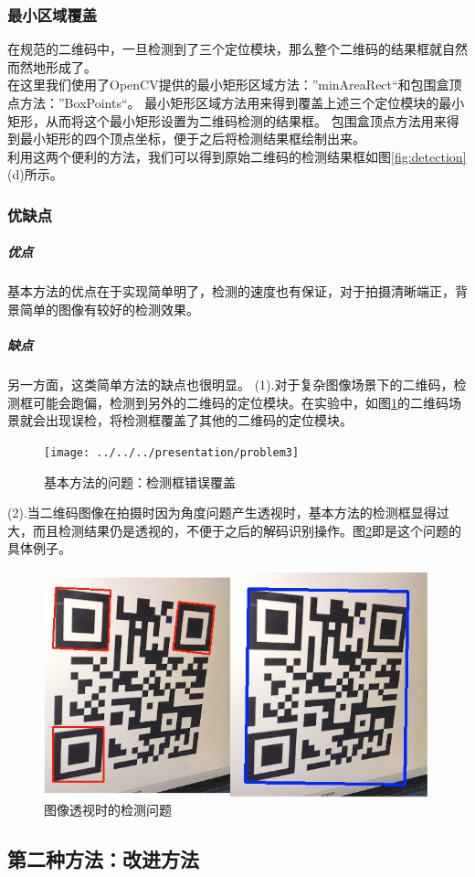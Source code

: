 \subsubsection{最小区域覆盖}
在规范的二维码中，一旦检测到了三个定位模块，那么整个二维码的结果框就自然而然地形成了。\\
在这里我们使用了OpenCV提供的最小矩形区域方法：”minAreaRect“和包围盒顶点方法：”BoxPoints“。
最小矩形区域方法用来得到覆盖上述三个定位模块的最小矩形，从而将这个最小矩形设置为二维码检测的结果框。
包围盒顶点方法用来得到最小矩形的四个顶点坐标，便于之后将检测结果框绘制出来。\\
利用这两个便利的方法，我们可以得到原始二维码的检测结果框如图\ref{fig:detection}(d)所示。

\subsubsection{优缺点}
\subparagraph{优点}
基本方法的优点在于实现简单明了，检测的速度也有保证，对于拍摄清晰端正，背景简单的图像有较好的检测效果。
\subparagraph{缺点}
另一方面，这类简单方法的缺点也很明显。
(1).对于复杂图像场景下的二维码，检测框可能会跑偏，检测到另外的二维码的定位模块。在实验中，如图\ref{fig:problem1}的二维码场景就会出现误检，将检测框覆盖了其他的二维码的定位模块。
\begin{figure}[h]
\centering
\texttt{[image: ../../../presentation/problem3]}
\caption[problem1]{基本方法的问题：检测框错误覆盖}
\label{fig:problem1}
\end{figure}

(2).当二维码图像在拍摄时因为角度问题产生透视时，基本方法的检测框显得过大，而且检测结果仍是透视的，不便于之后的解码识别操作。图\ref{fig:perspectiveproblem}即是这个问题的具体例子。
\begin{figure}[h]
\centering
\includegraphics[width=0.9\linewidth]{perspective_problem}
\caption[problem2]{图像透视时的检测问题}
\label{fig:perspectiveproblem}
\end{figure}

\subsection{第二种方法：改进方法}
